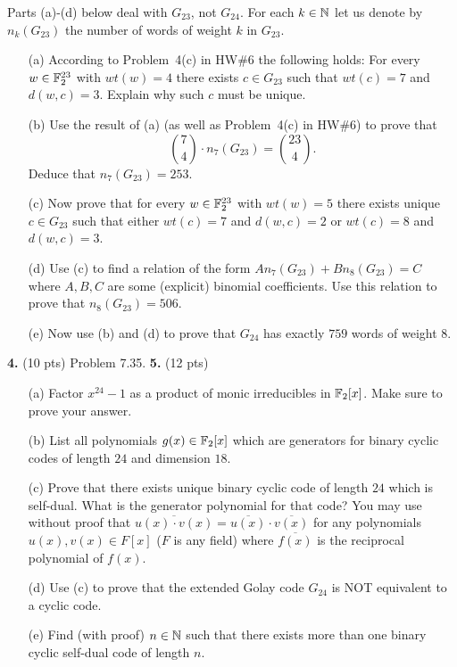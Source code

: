 \documentclass[12pt]{amsart}
\begin{document}
Parts (a)-(d) below deal with $G_{23}$, not $G_{24}$. For each $k\in{\mathbb N}$ let us denote by $n_k(G_{23})$ the number of words of weight $k$ in $G_{23}$.
\begin{itemize}
\item[(a)] According to Problem~4(c) in HW\#6 the following holds: For every $w\in {\mathbb F}_2^{23}$ with $wt(w)=4$ there exists $c\in G_{23}$
such that $wt(c)=7$ and $d(w,c)=3$. Explain why such $c$ must be unique.
\item[(b)] Use the result of (a) (as well as Problem~4(c) in HW\#6) to prove that $${7 \choose 4}\cdot n_{7}(G_{23})={23 \choose 4}.$$ Deduce that
$n_7(G_{23})=253$.
\item[(c)] Now prove that for every $w\in {\mathbb F}_2^{23}$ with $wt(w)=5$ there exists unique $c\in G_{23}$ such that either $wt(c)=7$ and $d(w,c)=2$ or $wt(c)=8$ and $d(w,c)=3$. 
\item[(d)] Use (c) to find a relation of the form $A n_7(G_{23}) + B n_8(G_{23})=C$ where $A,B,C$ are some (explicit) binomial coefficients. Use this relation to prove that $n_8(G_{23})=506$.
\item[(e)] Now use (b) and (d) to prove that $G_{24}$ has exactly $759$ words of weight $8$.
\end{itemize}
\skv
{\bf 4.} (10 pts) Problem 7.35.
\skv
{\bf 5.} (12 pts)
\begin{itemize}
\item[(a)] Factor $x^{24}-1$ as a product of monic irreducibles in ${\mathbb F}_2[x]$. Make sure to prove your answer.
\item[(b)] List all polynomials $g(x)\in {\mathbb F}_2[x]$ which are generators for binary cyclic codes of length $24$ and dimension $18$.
\item[(c)] Prove that there exists unique binary cyclic code of length $24$ which is self-dual. What is the generator polynomial for that code? You may use without proof that $\overline{u(x)\cdot v(x)}=\overline{u(x)}\cdot\overline{v(x)}$ for any polynomials
$u(x),v(x)\in F[x]$ ($F$ is any field) where $\overline{f(x)}$ is the reciprocal polynomial of $f(x)$.
\item[(d)] Use (c) to prove that the extended Golay code $G_{24}$ is NOT equivalent to a cyclic code.
\item[(e)] Find (with proof) $n\in{\mathbb N}$ such that there exists more than one binary cyclic self-dual code of length $n$.
\end{itemize}
\end{document}
